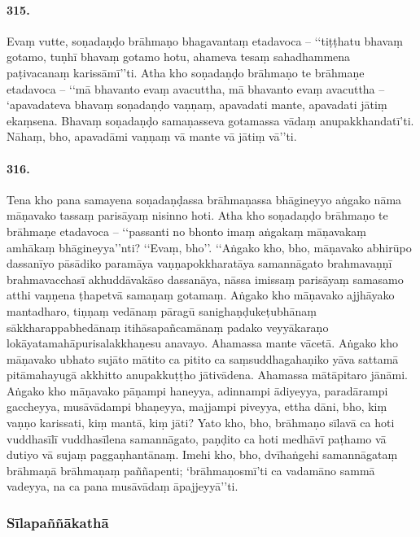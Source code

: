 \paragraph{315.} Evaṃ vutte, soṇadaṇḍo brāhmaṇo bhagavantaṃ etadavoca – ‘‘tiṭṭhatu bhavaṃ gotamo, tuṇhī bhavaṃ gotamo hotu, ahameva tesaṃ sahadhammena paṭivacanaṃ karissāmī’’ti. Atha kho soṇadaṇḍo brāhmaṇo te brāhmaṇe etadavoca – ‘‘mā bhavanto evaṃ avacuttha, mā bhavanto evaṃ avacuttha – ‘apavadateva bhavaṃ soṇadaṇḍo vaṇṇaṃ, apavadati mante, apavadati jātiṃ ekaṃsena. Bhavaṃ soṇadaṇḍo samaṇasseva gotamassa vādaṃ anupakkhandatī’ti. Nāhaṃ, bho, apavadāmi vaṇṇaṃ vā mante vā jātiṃ vā’’ti.

\paragraph{316.} Tena kho pana samayena soṇadaṇḍassa brāhmaṇassa bhāgineyyo aṅgako nāma māṇavako tassaṃ parisāyaṃ nisinno hoti. Atha kho soṇadaṇḍo brāhmaṇo te brāhmaṇe etadavoca – ‘‘passanti no bhonto imaṃ aṅgakaṃ māṇavakaṃ amhākaṃ bhāgineyya’’nti? ‘‘Evaṃ, bho’’. ‘‘Aṅgako kho, bho, māṇavako abhirūpo dassanīyo pāsādiko paramāya vaṇṇapokkharatāya samannāgato brahmavaṇṇī brahmavacchasī akhuddāvakāso dassanāya, nāssa imissaṃ parisāyaṃ samasamo atthi vaṇṇena ṭhapetvā samaṇaṃ gotamaṃ. Aṅgako kho māṇavako ajjhāyako mantadharo, tiṇṇaṃ vedānaṃ pāragū sanighaṇḍukeṭubhānaṃ sākkharappabhedānaṃ itihāsapañcamānaṃ padako veyyākaraṇo lokāyatamahāpurisalakkhaṇesu anavayo. Ahamassa mante vācetā. Aṅgako kho māṇavako ubhato sujāto mātito ca pitito ca saṃsuddhagahaṇiko yāva sattamā pitāmahayugā akkhitto anupakkuṭṭho jātivādena. Ahamassa mātāpitaro jānāmi. Aṅgako kho māṇavako pāṇampi haneyya, adinnampi ādiyeyya, paradārampi gaccheyya, musāvādampi bhaṇeyya, majjampi piveyya, ettha dāni, bho, kiṃ vaṇṇo karissati, kiṃ mantā, kiṃ jāti? Yato kho, bho, brāhmaṇo sīlavā ca hoti vuddhasīlī vuddhasīlena samannāgato, paṇḍito ca hoti medhāvī paṭhamo vā dutiyo vā sujaṃ paggaṇhantānaṃ. Imehi kho, bho, dvīhaṅgehi samannāgataṃ brāhmaṇā brāhmaṇaṃ paññapenti; ‘brāhmaṇosmī’ti ca vadamāno sammā vadeyya, na ca pana musāvādaṃ āpajjeyyā’’ti.

\subsubsection{Sīlapaññākathā}

